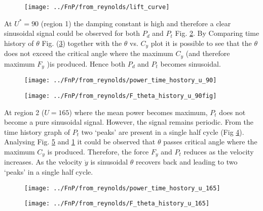 \begin{figure}
\centering
\texttt{[image: ../FnP/from\_reynolds/lift\_curve]}
\caption{}
\label{fig:lift_curve}
\end{figure}


At  $U^*=90$ (region 1) the damping constant is high and therefore a clear sinusoidal signal could be observed for both $P_d$ and $P_t$ Fig. \ref{fig:power_time_hostory_u_90}. By Comparing time history of $\theta$ Fig. (\ref{fig:F_theta_history_u_90fig}) together with the $\theta$ vs. $C_y$ plot it is possible to see that the $\theta$  does not exceed the critical angle where the maximum $C_y$ (and therefore maximum $F_y$ )is produced. Hence both $P_d$ and $P_t$ becomes sinusoidal.
\begin{figure}
\centering
\texttt{[image: ../FnP/from\_reynolds/power\_time\_hostory\_u\_90]}
\caption{}
\label{fig:power_time_hostory_u_90}
\end{figure}

\begin{figure}
\centering
\texttt{[image: ../FnP/from\_reynolds/F\_theta\_history\_u\_90fig]}
\caption{}
\label{fig:F_theta_history_u_90fig}
\end{figure}



At region 2 ($U=165$) where the mean power becomes maximum, $P_t$ does not become a pure sinusoidal signal. However, the  signal remains periodic. From the time history graph of $P_t$ two `peaks' are present in a single half cycle (Fig \ref{fig:power_time_hostory_u_165}). Analysing  Fig. \ref{fig:F_theta_history_u_165} and \ref{fig:lift_curve} it could be observed that $\theta$ passes critical angle where the maximum $C_y$ is produced. Therefore, the force $F_y$ and $P_t$ reduces as the velocity increases. As the velocity $\dot{y}$ is sinusoidal $\theta$ recovers back and leading to two `peaks'  in a single half cycle.


\begin{figure}
\centering
\texttt{[image: ../FnP/from\_reynolds/power\_time\_hostory\_u\_165]}
\caption{}
\label{fig:power_time_hostory_u_165}
\end{figure}

\begin{figure}
\centering
\texttt{[image: ../FnP/from\_reynolds/F\_theta\_history\_u\_165]}
\caption{}
\label{fig:F_theta_history_u_165}
\end{figure}


